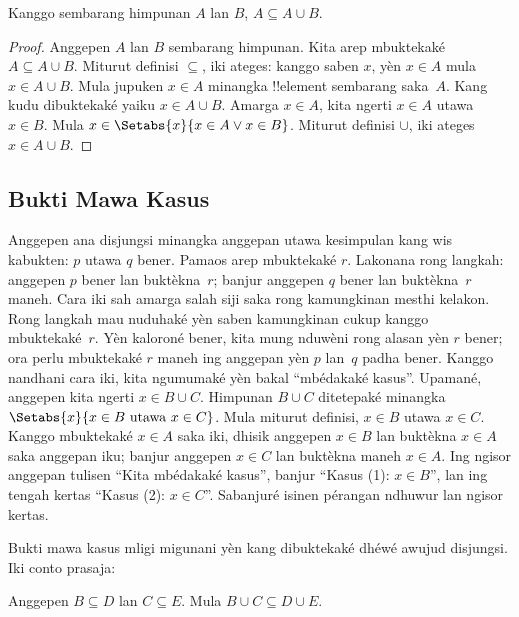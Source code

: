 \documentclass[../../../include/open-logic-section]{subfiles}
\begin{document}
\begin{prop}
  Kanggo sembarang himpunan $A$ lan $B$, $A \subseteq A \cup B$.
\end{prop}

\begin{proof}
  Anggepen $A$ lan $B$ sembarang himpunan. Kita arep mbuktekaké
  $A \subseteq A \cup B$. Miturut definisi $\subseteq$, iki
  ateges: kanggo saben $x$, yèn $x \in A$ mula $x \in A \cup B$.
  Mula jupuken $x \in A$ minangka !!{element} sembarang saka~$A$.
  Kang kudu dibuktekaké yaiku $x \in A \cup B$. Amarga $x \in A$,
  kita ngerti $x \in A$ utawa $x \in B$. Mula $x \in
  \Setabs{x}{x \in A \lor x \in B}$. Miturut definisi $\cup$,
  iki ateges $x \in A \cup B$.
\end{proof}

\subsection{Bukti Mawa Kasus}

Anggepen ana disjungsi minangka anggepan utawa kesimpulan kang
wis kabukten: $p$ utawa $q$ bener. Pamaos arep mbuktekaké
$r$. Lakonana rong langkah: anggepen $p$ bener lan buktèkna~$r$;
banjur anggepen $q$ bener lan buktèkna~$r$ maneh. Cara iki sah
amarga salah siji saka rong kamungkinan mesthi kelakon. Rong
langkah mau nuduhaké yèn saben kamungkinan cukup kanggo
mbuktekaké~$r$. Yèn kaloroné bener, kita mung nduwèni rong
alasan yèn $r$ bener; ora perlu mbuktekaké $r$ maneh ing
anggepan yèn $p$ lan~$q$ padha bener. Kanggo nandhani cara iki,
kita ngumumaké yèn bakal ``mbédakaké kasus''. Upamané, anggepen
kita ngerti $x \in B \cup C$. Himpunan $B \cup C$
ditetepaké minangka $\Setabs{x}{x \in B \text{ utawa } x \in C}$.
Mula miturut definisi, $x \in B$ utawa $x \in C$.
Kanggo mbuktekaké $x \in A$ saka iki, dhisik anggepen $x \in B$
lan buktèkna $x \in A$ saka anggepan iku; banjur anggepen
$x \in C$ lan buktèkna maneh $x \in A$. Ing ngisor anggepan
tulisen ``Kita mbédakaké kasus'', banjur ``Kasus (1): $x \in B$'',
lan ing tengah kertas ``Kasus (2): $x \in C$''. Sabanjuré
isinen pérangan ndhuwur lan ngisor kertas.

Bukti mawa kasus mligi migunani yèn kang dibuktekaké dhéwé
awujud disjungsi. Iki conto prasaja:

\begin{prop}
Anggepen $B \subseteq D$ lan $C \subseteq E$.
Mula $B \cup C \subseteq D \cup E$.
\end{prop}
\end{document}
